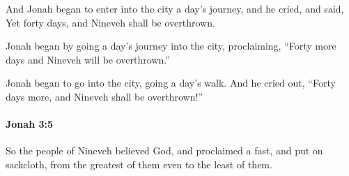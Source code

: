 			\begin{versebox}
					\item[BHS] 
					\item[LXX] 
					\item[ASV] And Jonah began to enter into the city a day's journey, and he cried, and said, Yet forty days, and Nineveh shall be overthrown.
					\item[NIV] Jonah began by going a day’s journey into the city, proclaiming, “Forty more days and Nineveh will be overthrown.”
					\item[NRSV] Jonah began to go into the city, going a day’s walk. And he cried out, “Forty days more, and Nineveh shall be overthrown!”
			\end{versebox}

		\paragraph{Jonah 3:5} %
			\label{JONAH-3-5}

			So the people of Nineveh believed God, and proclaimed a fast, and put on sackcloth, from the greatest of them even to the least of them.

